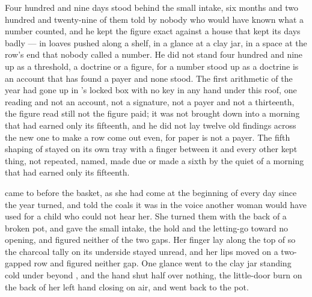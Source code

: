 Four hundred and nine days stood behind the small intake, six months and two hundred and twenty-nine of them told by nobody who would have known what a number counted, and he kept the figure exact against a house that kept its days badly --- in loaves pushed along a shelf, in a glance at a clay jar, in a space at the row's end that nobody called a number. He did not stand four hundred and nine up as a threshold, a doctrine or a figure, for a number stood up as a doctrine is an account that has found a payer and none stood. The first arithmetic of the year had gone up  in 's locked box with no key in any hand under this roof, one reading and not an account, not a signature, not a payer and not a thirteenth, the figure read still not the figure paid; it was not brought down into a morning that had earned only its fifteenth, and he did not lay twelve old findings across the new one to make a row come out even, for paper is not a payer. The fifth shaping of  stayed on its own tray with a finger between it and every other kept thing, not repeated, named, made due or made a sixth by the quiet of a morning that had earned only its fifteenth.

 came to  before the basket, as she had come at the beginning of every day since the year turned, and told the coals it was  in the voice another woman would have used for a child who could not hear her. She turned them with the back of a broken pot, and gave the small intake, the hold and the letting-go toward no opening, and figured neither of the two gaps. Her finger lay along the top of  so the charcoal tally on its underside stayed unread, and her lips moved on a two-gapped row and figured neither gap. One glance went to the clay jar standing cold under  beyond , and the hand shut half over nothing, the little-door burn on the back of her left hand closing on air, and went back to the pot.

